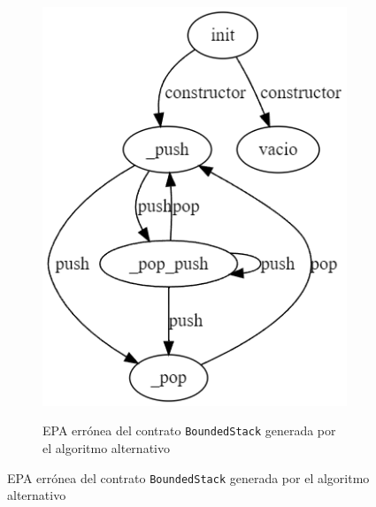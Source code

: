 \begin{figure}
\begin{subfigure}{0.45\textwidth}
        {\includegraphics[width=\textwidth]{figs/bonded-stack-bad-epa.png}}
        \caption{EPA errónea del contrato \texttt{BoundedStack} generada por el algoritmo alternativo}
        \label{fig:bounded-stack-bad-epa}
    \end{subfigure}
\end{figure}
